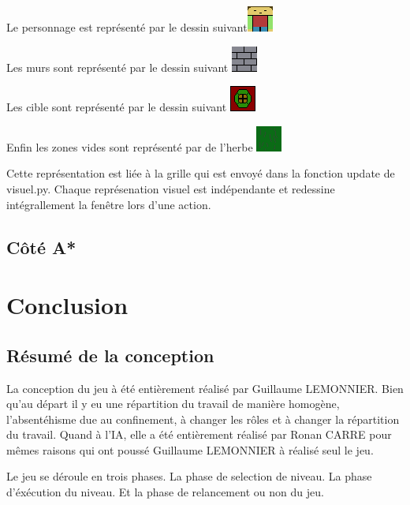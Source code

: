 \documentclass[a4paper,12pt]{article} %
\begin{document}
Le personnage est représenté par le dessin suivant\includegraphics{../picture/heros.png}

Les murs sont représenté par le dessin suivant \includegraphics{../picture/mur.png}

Les cible sont représenté par le dessin suivant \includegraphics{../picture/ciblage_tro-oof.png}

Enfin les zones vides sont représenté par de l'herbe \includegraphics{../picture/weed.png}

Cette représentation est liée à la grille qui est envoyé dans la fonction update de visuel.py.
Chaque représenation visuel est indépendante et redessine intégrallement la fenêtre lors d'une action.


\subsection{Côté A*}

\newpage

\section{Conclusion}

\subsection{Résumé de la conception}

La conception du jeu à été entièrement réalisé par Guillaume LEMONNIER.
Bien qu'au départ il y eu une répartition du travail de manière homogène, l'absentéhisme due au confinement, à changer les rôles et à changer la répartition du travail.
Quand à l'IA, elle a été entièrement réalisé par Ronan CARRE pour mêmes raisons qui ont poussé Guillaume LEMONNIER à réalisé seul le jeu.

Le jeu se déroule en trois phases.
La phase de selection de niveau.
La phase d'éxécution du niveau.
Et la phase de relancement ou non du jeu.
\end{document}
